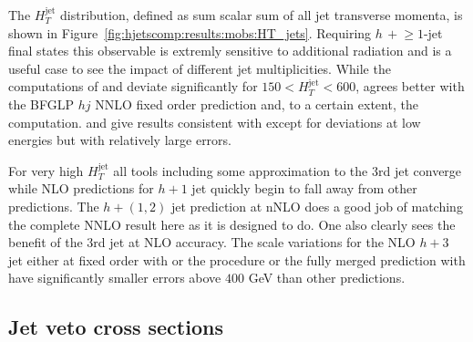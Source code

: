 
The $H_T^\text{jet}$ distribution, defined as sum scalar sum of all jet 
transverse momenta, is shown in Figure~\ref{fig:hjetscomp:results:mobs:HT_jets}. 
Requiring $h\,+\!\ge\!\!1$-jet final states this observable is
extremly sensitive to additional radiation and is a useful case to see 
the impact of different jet multiplicities. While the \NNLOPS 
computations of \Sherpa and \Powheg deviate significantly for 
$150 < H_T^\text{jet} < 600$, \Sherpa \NNLOPS agrees better with 
the BFGLP $hj$ NNLO fixed order prediction and, to a certain extent, 
the \Sherpa \MEPSatNLO computation. \Herwig and \MGaMC give results 
consistent with \Powheg except for deviations at low energies but with 
relatively large errors.

For very high $H_T^\text{jet}$ all tools including some approximation to the 3rd
jet converge while NLO predictions for $h+1$ jet quickly begin to fall away
from other predictions. The \Loopsim $h+(1,2)$ jet prediction at nNLO does a good
job of matching the complete NNLO result here as it is designed to do. One also
clearly sees the benefit of the 3rd jet at NLO accuracy.  The scale variations
for the NLO $h+3$ jet either at fixed order with \Loopsim or the \Minlo
procedure or the fully merged prediction with \Sherpa \MEPSatNLO have
significantly smaller errors above $400$ GeV than other predictions.




\clearpage
\subsection{Jet veto cross sections}
\label{sec:hjetscomp:results:jvobs}



